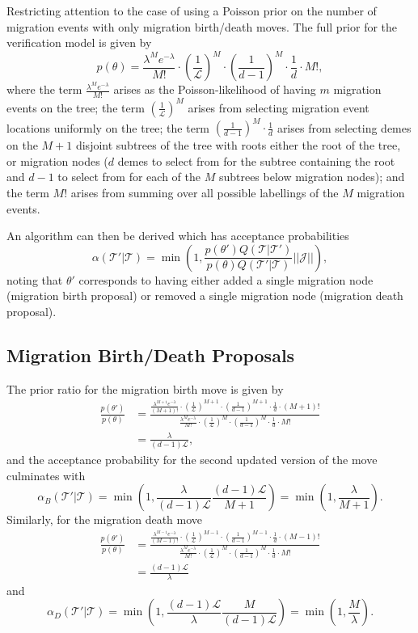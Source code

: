 \documentclass[12pt,a4paper]{article}
\newcommand{\calJ}{\mathcal{J}}
\newcommand{\calL}{\mathcal{L}}
\newcommand{\calT}{\mathcal{T}}
\begin{document}
		Restricting attention to the case of using a Poisson prior on the number of migration events with only migration birth/death moves. The full prior for the verification model is given by
			\[
				p(\theta) = \frac{\lambda^M e^{-\lambda}}{M!} \cdot \left( \frac{1}{\calL} \right)^M \cdot \left( \frac{1}{d-1} \right)^M \cdot \frac{1}{d} \cdot M!,
			\]
		where the term $\frac{\lambda^M e^{-\lambda}}{M!}$ arises as the Poisson-likelihood of having $m$ migration events on the tree; the term $\left( \frac{1}{\calL} \right)^M$ arises from selecting migration event locations uniformly on the tree; the term $\left( \frac{1}{d-1} \right)^M \cdot \frac{1}{d}$ arises from selecting demes on the $M+1$ disjoint subtrees of the tree with roots either the root of the tree, or migration nodes ($d$ demes to select from for the subtree containing the root and $d-1$ to select from for each of the $M$ subtrees below migration nodes); and the term $M!$ arises from summing over all possible labellings of the $M$ migration events.
		
		An algorithm can then be derived which has acceptance probabilities
			\[
				\alpha (\calT' | \calT) = \min \left(1, \frac{p(\theta') Q(\calT | \calT')}{p(\theta) Q(\calT' | \calT)} || \calJ ||\right),
			\]
		noting that $\theta'$ corresponds to having either added a single migration node (migration birth proposal) or removed a single migration node (migration death proposal).
		
		\subsection{Migration Birth/Death Proposals}
			The prior ratio for the migration birth move is given by
				\begin{align*}
					\frac{p(\theta')}{p(\theta)} & = \frac{\frac{\lambda^{M+1} e^{-\lambda}}{(M+1)!} \cdot \left( \frac{1}{\calL} \right)^{M+1} \cdot \left( \frac{1}{d-1} \right)^{M+1} \cdot \frac{1}{d} \cdot (M+1)!}{\frac{\lambda^M e^{-\lambda}}{M!} \cdot \left( \frac{1}{\calL} \right)^M \cdot \left( \frac{1}{d-1} \right)^M \cdot \frac{1}{d} \cdot M!} \\
						& = \frac{\lambda}{(d-1) \calL },
				\end{align*}
			and the acceptance probability for the second updated version of the move culminates with
				\[
					\alpha_B (\calT' | \calT) = \min \left(1, \frac{\lambda}{(d-1) \calL} \frac{(d-1) \calL}{M+1}\right) = \min \left(1, \frac{\lambda }{M+1}\right).
				\]
			Similarly, for the migration death move
				\begin{align*}
					\frac{p(\theta')}{p(\theta)} & = \frac{\frac{\lambda^{M-1} e^{-\lambda}}{(M-1)!} \cdot \left( \frac{1}{\calL} \right)^{M-1} \cdot \left( \frac{1}{d-1} \right)^{M-1} \cdot \frac{1}{d} \cdot (M-1)!}{\frac{\lambda^M e^{-\lambda}}{M!} \cdot \left( \frac{1}{\calL} \right)^M \cdot \left( \frac{1}{d-1} \right)^M \cdot \frac{1}{d} \cdot M!} \\
						& = \frac{(d-1) \calL }{\lambda}
				\end{align*}
			and
				\[
					\alpha_D (\calT' | \calT) = \min \left(1, \frac{(d-1) \calL}{\lambda} \frac{M}{(d-1) \calL} \right) = \min \left( 1, \frac{M}{\lambda} \right).
				\]
				
\end{document}
